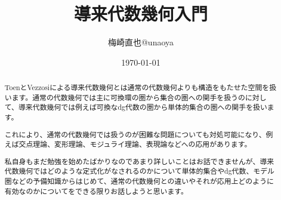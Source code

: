 \documentclass[uplatex]{jsarticle}
\title{導来代数幾何入門}
\author{梅崎直也@unaoya}
\date{\today}
\begin{document}
\maketitle
\begin{abstract}
ToenとVezzosiによる導来代数幾何とは通常の代数幾何よりも構造をもたせた空間を扱います。通常の代数幾何では主に可換環の圏から集合の圏への関手を扱うのに対して、導来代数幾何では例えば可換なdg代数の圏から単体的集合の圏への関手を扱います。

これにより、通常の代数幾何では扱うのが困難な問題についても対処可能になり、例えば交点理論、変形理論、モジュライ理論、表現論などへの応用があります。

私自身もまだ勉強を始めたばかりなのであまり詳しいことはお話できませんが、導来代数幾何ではどのような定式化がなされるのかについて単体的集合やdg代数、モデル圏などの予備知識からはじめて、通常の代数幾何との違いやそれが応用上どのように有効なのかについてをできる限りお話しようと思います。
\end{abstract}
\end{document}
